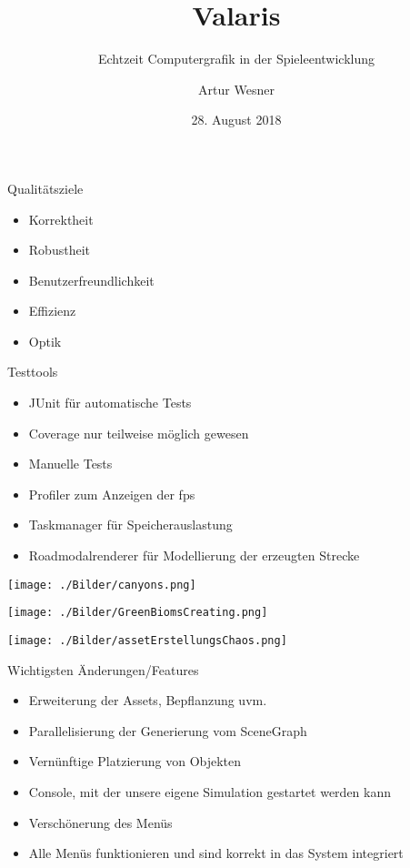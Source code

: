 \documentclass[10pt]{beamer}
\title{Valaris}
\subtitle{Echtzeit Computergrafik in der Spieleentwicklung}
\date{28. August 2018}
\author{Artur Wesner}
\begin{document}
\maketitle

\begin{frame}{Qualitätsziele}
  \begin{itemize}
    \item Korrektheit
    \item Robustheit
    \item Benutzerfreundlichkeit
    \item Effizienz
    \item Optik 
  \end{itemize}
\end{frame}

\begin{frame}{Testtools}
    \begin{itemize}
        \item JUnit für automatische Tests
        \item Coverage nur teilweise möglich gewesen
        \item Manuelle Tests 
        \item Profiler zum Anzeigen der fps
        \item Taskmanager für Speicherauslastung
        \item Roadmodalrenderer für Modellierung der erzeugten Strecke
      \end{itemize}
\end{frame}

\begin{frame}[standout]{}
    \texttt{[image: ./Bilder/canyons.png]}\\
\end{frame}

\begin{frame}[standout]{}
    \texttt{[image: ./Bilder/GreenBiomsCreating.png]}\\
\end{frame}

\begin{frame}[standout]{}
    \texttt{[image: ./Bilder/assetErstellungsChaos.png]}\\
\end{frame}

\begin{frame}{Wichtigsten Änderungen/Features}
    \begin{itemize}
        \item Erweiterung der Assets, Bepflanzung uvm.
        \item Parallelisierung der Generierung vom SceneGraph
        \item Vernünftige Platzierung von Objekten
        \item Console, mit der unsere eigene Simulation gestartet werden kann
        \item Verschönerung des Menüs
        \item Alle Menüs funktionieren und sind korrekt in das System integriert
    \end{itemize} 
\end{frame}
\end{document}
